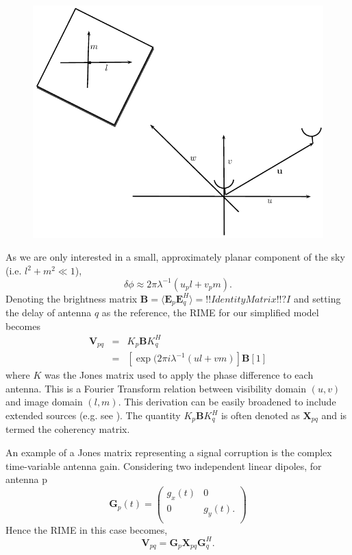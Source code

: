 \begin{figure}[h]
\includegraphics[width=\columnwidth]{Images/int_ill}
\caption{ \label{fig:int_ill}
}
\end{figure}

As we are only interested in a small, approximately planar component of the sky (i.e. $l^2 +m^2 \ll 1$),
\begin{equation}
 \delta \phi \approx 2\pi \lambda^{-1} (u_pl +v_pm).
\end{equation}
Denoting the brightness matrix $\bm{B} = \langle {\bm E}_p  {\bm E}_q^H \rangle = !!Identity Matrix!!? I$ and setting the delay of antenna $q$ as the reference, the RIME for our simplified model becomes
\begin{eqnarray}\label{eq:van-citterlike}
\bm{V}_{pq} &=& K_p \bm{B} K_q^H \\
&=&  \left[\exp (2\pi i \lambda^{-1} (ul +vm)\right] \bm{B} \left[1\right]
\end{eqnarray}
where $K$ was the Jones matrix used to apply the phase difference to each antenna. This is a Fourier Transform relation between visibility domain $(u,v)$ and image domain $(l,m)$. This derivation can be easily broadened to include extended sources (e.g. see \citep{Smirnov_2011a}). The quantity  $K_p \bm{B} K_q^H$ is often denoted as $\bm{X}_{pq}$ and is termed the coherency matrix.


An example of a Jones matrix representing a signal corruption is the complex time-variable antenna gain. Considering two independent linear dipoles,  for antenna p
\begin{equation}\label{eq:G_jones}
\bm{G}_p(t) =
\left(
\begin{array}{cc}
g_x (t)&0\\
0 & g_y (t). \\
\end{array}
\right)
\end{equation}
Hence the RIME in this case becomes,
\begin{equation}\label{eq:G_rime}
\bm{V}_{pq} = \bm G_p \bm{X}_{pq} \bm G_q^H.
\end{equation}

